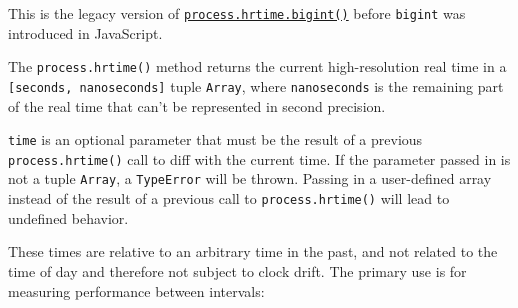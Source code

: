 This is the legacy version of
\hyperref[processhrtimebigint]{\texttt{process.hrtime.bigint()}} before
\texttt{bigint} was introduced in JavaScript.

The \texttt{process.hrtime()} method returns the current high-resolution
real time in a \texttt{{[}seconds,\ nanoseconds{]}} tuple
\texttt{Array}, where \texttt{nanoseconds} is the remaining part of the
real time that can't be represented in second precision.

\texttt{time} is an optional parameter that must be the result of a
previous \texttt{process.hrtime()} call to diff with the current time.
If the parameter passed in is not a tuple \texttt{Array}, a
\texttt{TypeError} will be thrown. Passing in a user-defined array
instead of the result of a previous call to \texttt{process.hrtime()}
will lead to undefined behavior.

These times are relative to an arbitrary time in the past, and not
related to the time of day and therefore not subject to clock drift. The
primary use is for measuring performance between intervals:

\begin{Shaded}
\begin{Highlighting}[]
 \OperatorTok{;}

\OperatorTok{=} \OperatorTok{;}
\OperatorTok{=} \NormalTok{()}\OperatorTok{;}
\CommentTok{// [ 1800216, 25 ]}

\NormalTok{(() }\KeywordTok{=\textgreater{}}\NormalTok{ \{}
  \OperatorTok{=} \OperatorTok{;}
  \CommentTok{// [ 1, 552 ]}

  \NormalTok{(}\SpecialCharTok{$\{}\NormalTok{diff[}\NormalTok{] }\OperatorTok{*}\OperatorTok{+}\NormalTok{ diff[}\NormalTok{]}\SpecialCharTok{\}}\NormalTok{)}\OperatorTok{;}
\NormalTok{\}}\OperatorTok{,} \NormalTok{)}\OperatorTok{;}
\end{Highlighting}
\end{Shaded}

